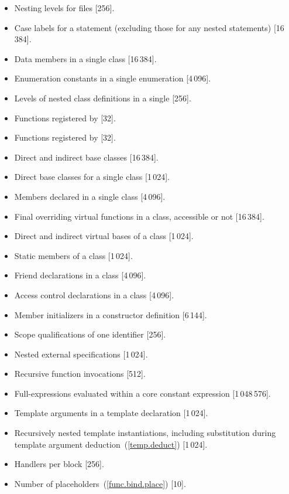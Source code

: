 \begin{itemize}
\item%
Nesting levels for
files [256].
\item%
Case labels for a
statement (excluding those for any nested
statements)
[16\,384].
\item%
Data members in a single class [16\,384].
\item%
Enumeration constants in a single enumeration [4\,096].
\item%
Levels of nested class definitions
in a single
[256].
\item%
Functions registered by
 [32].
\item%
Functions registered by
 [32].
\item%
Direct and indirect base classes [16\,384].
\item%
Direct base classes for a single class [1\,024].
\item%
Members declared in a single class [4\,096].
\item%
Final overriding virtual functions in a class,
accessible or not [16\,384].
\item%
Direct and indirect virtual bases of a class [1\,024].
\item%
Static members of a class [1\,024].
\item%
Friend declarations in a class [4\,096].
\item%
Access control declarations in a class [4\,096].
\item%
Member initializers in a constructor definition [6\,144].
\item%
Scope qualifications of one identifier [256].
\item%
Nested external specifications [1\,024].
\item%
Recursive  function invocations [512].
\item%
Full-expressions evaluated within a core constant expression [1\,048\,576].
\item%
Template arguments in a template declaration [1\,024].
\item%
Recursively nested template instantiations, including substitution
during template argument deduction~(\ref{temp.deduct}) [1\,024].
\item%
Handlers per
block [256].
\item%
Number of placeholders~(\ref{func.bind.place}) [10].

\end{itemize}
